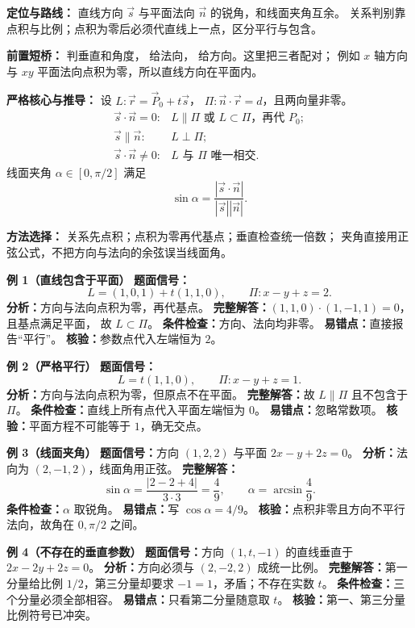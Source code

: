 \begin{knowledgeBox}
\textbf{定位与路线：}
直线方向 \(\vec s\) 与平面法向 \(\vec n\) 的锐角，和线面夹角互余。
关系判别靠点积与比例；点积为零后必须代直线上一点，区分平行与包含。

\textbf{前置短桥：}
判垂直和角度，
给法向，
给方向。这里把三者配对；
例如 \(x\) 轴方向与 \(xy\) 平面法向点积为零，所以直线方向在平面内。

\textbf{严格核心与推导：}
设 \(L:\vec r=\vec P_0+t\vec s\)，
\(\Pi:\vec n\cdot\vec r=d\)，且两向量非零。
\[
\begin{array}{ll}
\vec s\cdot\vec n=0:&L\parallel\Pi\text{ 或 }L\subset\Pi\text{，再代 }P_0;\\
\vec s\parallel\vec n:&L\perp\Pi;\\
\vec s\cdot\vec n\ne0:&L\text{ 与 }\Pi\text{ 唯一相交}.
\end{array}
\]
线面夹角 \(\alpha\in[0,\pi/2]\) 满足
\[
\sin\alpha=\frac{|\vec s\cdot\vec n|}{|\vec s||\vec n|}.
\]

\textbf{方法选择：}
关系先点积；点积为零再代基点；垂直检查统一倍数；
夹角直接用正弦公式，不把方向与法向的余弦误当线面角。

\textbf{例 1（直线包含于平面）}
\textbf{题面信号：}
\[
L=(1,0,1)+t(1,1,0),\qquad \Pi:x-y+z=2.
\]
\textbf{分析：}方向与法向点积为零，再代基点。
\textbf{完整解答：}\((1,1,0)\cdot(1,-1,1)=0\)，且基点满足平面，
故 \(L\subset\Pi\)。
\textbf{条件检查：}方向、法向均非零。
\textbf{易错点：}直接报告“平行”。
\textbf{核验：}参数点代入左端恒为 \(2\)。

\textbf{例 2（严格平行）}
\textbf{题面信号：}
\[
L=t(1,1,0),\qquad \Pi:x-y+z=1.
\]
\textbf{分析：}方向与法向点积为零，但原点不在平面。
\textbf{完整解答：}故 \(L\parallel\Pi\) 且不包含于 \(\Pi\)。
\textbf{条件检查：}直线上所有点代入平面左端恒为 \(0\)。
\textbf{易错点：}忽略常数项。
\textbf{核验：}平面方程不可能等于 \(1\)，确无交点。

\textbf{例 3（线面夹角）}
\textbf{题面信号：}方向 \((1,2,2)\) 与平面 \(2x-y+2z=0\)。
\textbf{分析：}法向为 \((2,-1,2)\)，线面角用正弦。
\textbf{完整解答：}
\[
\sin\alpha=\frac{|2-2+4|}{3\cdot3}=\frac49,
\qquad \alpha=\arcsin\frac49.
\]
\textbf{条件检查：}\(\alpha\) 取锐角。
\textbf{易错点：}写 \(\cos\alpha=4/9\)。
\textbf{核验：}点积非零且方向不平行法向，故角在 \(0,\pi/2\) 之间。

\textbf{例 4（不存在的垂直参数）}
\textbf{题面信号：}方向 \((1,t,-1)\) 的直线垂直于
\(2x-2y+2z=0\)。
\textbf{分析：}方向必须与 \((2,-2,2)\) 成统一比例。
\textbf{完整解答：}第一分量给比例 \(1/2\)，第三分量却要求
\(-1=1\)，矛盾；不存在实数 \(t\)。
\textbf{条件检查：}三个分量必须全部相容。
\textbf{易错点：}只看第二分量随意取 \(t\)。
\textbf{核验：}第一、第三分量比例符号已冲突。


\end{knowledgeBox}
